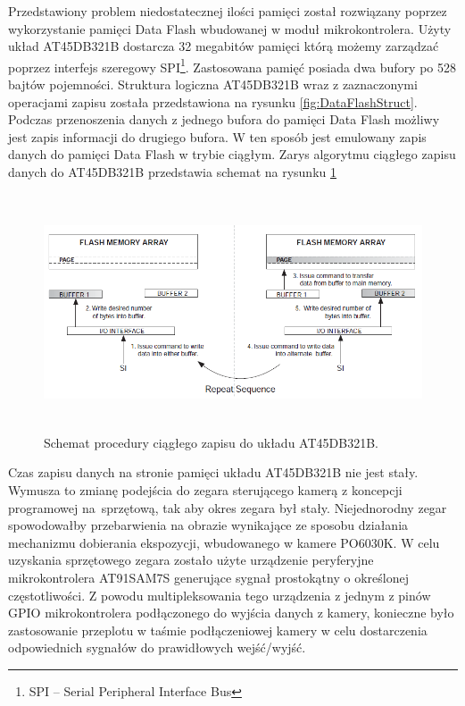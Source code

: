 Przedstawiony problem niedostatecznej ilości pamięci został rozwiązany poprzez
wykorzystanie pamięci Data Flash wbudowanej w moduł mikrokontrolera. Użyty układ
AT45DB321B\cite{AT45DB321BDataSheet} dostarcza 32 megabitów pamięci którą możemy
zarządzać poprzez interfejs szeregowy SPI\footnote{SPI -- Serial Peripheral
Interface Bus}. Zastosowana pamięć posiada dwa bufory po 528 bajtów pojemności.
Struktura logiczna AT45DB321B wraz z zaznaczonymi operacjami zapisu została
przedstawiona na rysunku \ref{fig:DataFlashStruct}.  Podczas przenoszenia danych
z jednego bufora do pamięci Data Flash możliwy jest zapis informacji do drugiego
bufora. W ten sposób jest emulowany zapis danych do pamięci Data Flash w trybie
ciągłym. Zarys algorytmu ciągłego zapisu danych do AT45DB321B przedstawia schemat
na rysunku \ref{fig:DataFlashConstantWrite}

\begin{figure}[ht!]
 \centering
 \includegraphics[height=70mm]{../images/ch04/dataflash_constant_write.png}
 \caption{Schemat procedury ciągłego zapisu do układu AT45DB321B\cite{AT45DB321BApplicationNote}.}
 \label{fig:DataFlashConstantWrite}
\end{figure}

Czas zapisu danych na stronie pamięci układu AT45DB321B nie jest stały. Wymusza
to zmianę podejścia do zegara sterującego kamerą z koncepcji programowej na~sprzętową, tak aby okres zegara był stały. Niejednorodny zegar spowodowałby
przebarwienia na obrazie wynikające ze sposobu działania mechanizmu dobierania
ekspozycji, wbudowanego w kamere PO6030K. W celu uzyskania sprzętowego zegara
zostało użyte urządzenie peryferyjne mikrokontrolera AT91SAM7S generujące
sygnał prostokątny o określonej częstotliwości. Z powodu multipleksowania tego
urządzenia z jednym z pinów GPIO mikrokontrolera podłączonego do wyjścia danych z
kamery, konieczne było zastosowanie przeplotu w taśmie podłączeniowej kamery w
celu dostarczenia odpowiednich sygnałów do prawidłowych wejść/wyjść.

